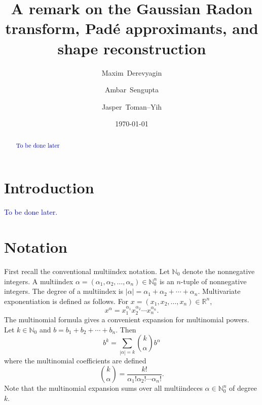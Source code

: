 \documentclass{amsart}
\theoremstyle{remark}
\numberwithin{equation}{section}
\newcommand{\tc}{\textcolor{blue}}
\newcommand{\RR}{\mathbb{R}}
\newcommand{\NN}{\mathbb{N}}
\begin{document}
\title{A remark on the Gaussian Radon transform, Pad\'e approximants, and shape reconstruction}


\date{\today}

\author[M.~Derevyagin]{Maxim~Derevyagin}
\address{
MD,
Department of Mathematics\\
University of Connecticut\\
341 Mansfield Road, U-1009\\
Storrs, CT 06269–1009, USA}

\author[A.~Sengupta]{Ambar~Sengupta}
\address{
AS,
Department of Mathematics\\
University of Connecticut\\
341 Mansfield Road, U–1009\\
Storrs, CT 0626–91009, USA}

\author[J.~Toman–Yih]{Jasper~Toman–Yih}
\address{
JT,
Department of Mathematics\\
University of Connecticut\\
341 Mansfield Road, U–1009\\
Storrs, CT 06269–1009, USA}


\begin{abstract}
\tc{To be done later}
\end{abstract}

\maketitle

\section{Introduction}

\tc{To be done later.}
\newpage
\section{Notation}

First recall the conventional multiindex notation. Let $\NN_0$ denote the nonnegative integers. A multiindex $\alpha = (\alpha_1, \alpha_2, \ldots, \alpha_n) \in \NN_0^n$ is an $n$-tuple of nonnegative integers. The degree of a multiindex is $|\alpha| = \alpha_1 + \alpha_2 + \cdots + \alpha_n$. Multivariate exponentiation is defined as follows. For $x = (x_1, x_2, \ldots, x_n) \in \RR^n$,
\[
    x^\alpha = x_1^{\alpha_1}x_2^{\alpha_2} \cdots x_n^{\alpha_n}.
\]
The multinomial formula gives a convenient expansion for multinomial powers. Let $k \in \NN_0$ and $b = b_1 + b_2 + \cdots + b_n$. Then
\[
    b^k = \sum_{|\alpha| = k} \binom{k}{\alpha} b^\alpha
\] 
where the multinomial coefficients are defined
\[
    \binom{k}{\alpha} = \frac{k!}{\alpha_1! \alpha_2! \cdots \alpha_n!}.
\]
Note that the multinomial expansion sums over all multiindeces $\alpha \in \NN_0^n$ of degree $k$.
\end{document}
